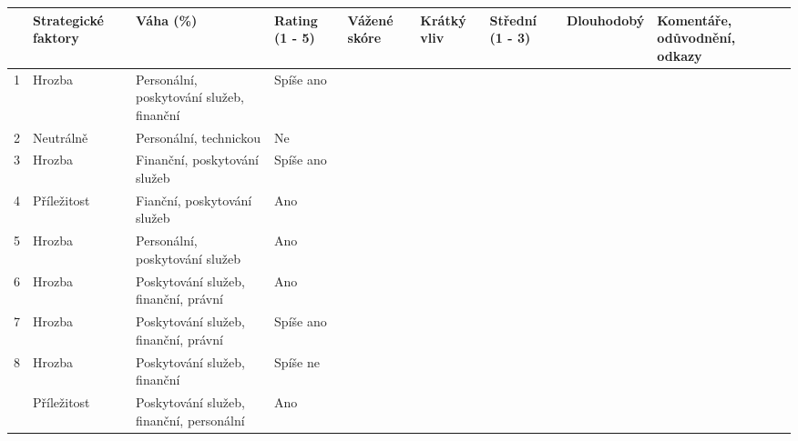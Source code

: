 \begin{table}[]
\begin{tabular}{|l|l|l|l|l|llll|}
\hline
 & Strategické faktory & Váha (\%) & Rating (1 - 5) & Vážené skóre & \multicolumn{1}{l|}{Krátký vliv} & \multicolumn{1}{l|}{Střední (1 - 3)} & \multicolumn{1}{l|}{Dlouhodobý} & Komentáře, odůvodnění, odkazy \\ \hline
1 & Hrozba & Personální, poskytování služeb, finanční & Spíše ano &  & \multicolumn{1}{l|}{} & \multicolumn{1}{l|}{} & \multicolumn{1}{l|}{} &  \\ \hline
2 & Neutrálně & Personální, technickou & Ne &  & \multicolumn{1}{l|}{} & \multicolumn{1}{l|}{} & \multicolumn{1}{l|}{} &  \\ \hline
3 & Hrozba & Finanční, poskytování služeb & Spíše ano &  & \multicolumn{1}{l|}{} & \multicolumn{1}{l|}{} & \multicolumn{1}{l|}{} &  \\ \hline
4 & Příležitost & Fianční, poskytování služeb & Ano &  & \multicolumn{1}{l|}{} & \multicolumn{1}{l|}{} & \multicolumn{1}{l|}{} &  \\ \hline
5 & Hrozba & Personální, poskytování služeb & Ano &  & \multicolumn{1}{l|}{} & \multicolumn{1}{l|}{} & \multicolumn{1}{l|}{} &  \\ \hline
6 & Hrozba & Poskytování služeb, finanční, právní & Ano &  & \multicolumn{1}{l|}{} & \multicolumn{1}{l|}{} & \multicolumn{1}{l|}{} &  \\ \hline
7 & Hrozba & Poskytování služeb, finanční, právní & Spíše ano &  & \multicolumn{1}{l|}{} & \multicolumn{1}{l|}{} & \multicolumn{1}{l|}{} &  \\ \hline
8 & Hrozba & Poskytování služeb, finanční & Spíše ne &  & \multicolumn{1}{l|}{} & \multicolumn{1}{l|}{} & \multicolumn{1}{l|}{} &  \\ \hline
 & Příležitost & Poskytování služeb, finanční, personální & Ano &  & \multicolumn{4}{l|}{} \\ \hline
\end{tabular}
\end{table}